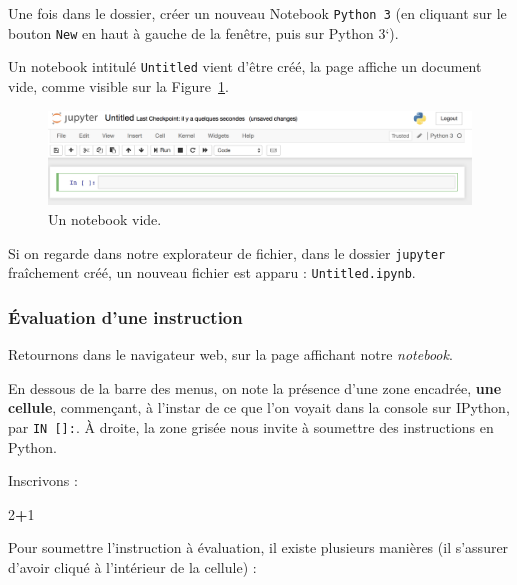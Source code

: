 \documentclass[
  12pt,
]{book}
\newenvironment{Shaded}{\begin{snugshade}}{\end{snugshade}}
\newcommand{\DecValTok}[1]{\textcolor[rgb]{0.00,0.00,0.81}{#1}}
\newcommand{\OperatorTok}[1]{\textcolor[rgb]{0.81,0.36,0.00}{\textbf{#1}}}
\numberwithin{equation}{section}
\numberwithin{countremarque}{section}
\begin{document}
Une fois dans le dossier, créer un nouveau Notebook \texttt{Python\ 3} (en cliquant sur le bouton \texttt{New} en haut à gauche de la fenêtre, puis sur Python 3`).

Un notebook intitulé \texttt{Untitled} vient d'être créé, la page affiche un document vide, comme visible sur la Figure~\ref{fig:intro-jupyter-notebook}.

\begin{figure}[H]

{\centering \includegraphics[width=1\linewidth]{figs/jupyter_notebook} 

}

\caption{Un notebook vide.}\label{fig:intro-jupyter-notebook}
\end{figure}

Si on regarde dans notre explorateur de fichier, dans le dossier \texttt{jupyter} fraîchement créé, un nouveau fichier est apparu : \texttt{Untitled.ipynb}.

\subsubsection{Évaluation d'une instruction}\label{uxe9valuation-dune-instruction}

Retournons dans le navigateur web, sur la page affichant notre \emph{notebook}.

En dessous de la barre des menus, on note la présence d'une zone encadrée, \textbf{une cellule}, commençant, à l'instar de ce que l'on voyait dans la console sur IPython, par \texttt{IN\ {[}{]}:}. À droite, la zone grisée nous invite à soumettre des instructions en Python.

Inscrivons :

\begin{Shaded}
\begin{Highlighting}[]
\DecValTok{2}\OperatorTok{+}\DecValTok{1}
\end{Highlighting}
\end{Shaded}

Pour soumettre l'instruction à évaluation, il existe plusieurs manières (il s'assurer d'avoir cliqué à l'intérieur de la cellule) :
\end{document}
